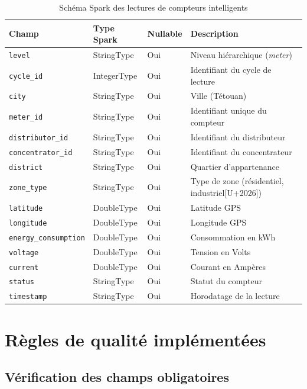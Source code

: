 \documentclass[1pt,a4paper]{report}
\begin{document}
\begin{table}[H]
\centering
\caption{Sch\'{e}ma Spark des lectures de compteurs intelligents}
\label{tab:schema_meters}
\renewcommand{\arraystretch}{1.3}
\begin{tabularx}{\textwidth}{|l|l|l|X|}
\hline
\rowcolor{primaryblue!20}
\textbf{Champ} & \textbf{Type Spark} & \textbf{Nullable} & \textbf{Description} \\
\hline
\texttt{level} & StringType & Oui & Niveau hi\'{e}rarchique (\textit{meter}) \\
\texttt{cycle\_id} & IntegerType & Oui & Identifiant du cycle de lecture \\
\texttt{city} & StringType & Oui & Ville (T\'{e}touan) \\
\texttt{meter\_id} & StringType & Oui & Identifiant unique du compteur \\
\texttt{distributor\_id} & StringType & Oui & Identifiant du distributeur \\
\texttt{concentrator\_id} & StringType & Oui & Identifiant du concentrateur \\
\texttt{district} & StringType & Oui & Quartier d'appartenance \\
\texttt{zone\_type} & StringType & Oui & Type de zone (r\'{e}sidentiel, industriel[U+2026]) \\
\texttt{latitude} & DoubleType & Oui & Latitude GPS \\
\texttt{longitude} & DoubleType & Oui & Longitude GPS \\
\texttt{energy\_consumption} & DoubleType & Oui & Consommation en kWh \\
\texttt{voltage} & DoubleType & Oui & Tension en Volts \\
\texttt{current} & DoubleType & Oui & Courant en Amp\`{e}res \\
\texttt{status} & StringType & Oui & Statut du compteur \\
\texttt{timestamp} & StringType & Oui & Horodatage de la lecture \\
\hline
\end{tabularx}
\end{table}

\section{R\`{e}gles de qualit\'{e} impl\'{e}ment\'{e}es}



\subsection{V\'{e}rification des champs obligatoires}
\end{document}
